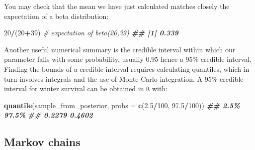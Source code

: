 \documentclass[
  12pt,
]{krantz}
\newenvironment{Shaded}{\begin{snugshade}}{\end{snugshade}}
\newcommand{\AttributeTok}[1]{\textcolor[rgb]{0.13,0.29,0.53}{#1}}
\newcommand{\CommentTok}[1]{\textcolor[rgb]{0.56,0.35,0.01}{\textit{#1}}}
\newcommand{\DecValTok}[1]{\textcolor[rgb]{0.00,0.00,0.81}{#1}}
\newcommand{\DocumentationTok}[1]{\textcolor[rgb]{0.56,0.35,0.01}{\textbf{\textit{#1}}}}
\newcommand{\FloatTok}[1]{\textcolor[rgb]{0.00,0.00,0.81}{#1}}
\newcommand{\FunctionTok}[1]{\textcolor[rgb]{0.13,0.29,0.53}{\textbf{#1}}}
\newcommand{\NormalTok}[1]{#1}
\newcommand{\SpecialCharTok}[1]{\textcolor[rgb]{0.81,0.36,0.00}{\textbf{#1}}}
\begin{document}
You may check that the mean we have just calculated matches closely the expectation of a beta distribution:

\begin{Shaded}
\begin{Highlighting}[]
\DecValTok{20}\SpecialCharTok{/}\NormalTok{(}\DecValTok{20}\SpecialCharTok{+}\DecValTok{39}\NormalTok{) }\CommentTok{\# expectation of beta(20,39)}
\DocumentationTok{\#\# [1] 0.339}
\end{Highlighting}
\end{Shaded}

Another useful numerical summary is the credible interval within which our parameter falls with some probability, usually 0.95 hence a 95\(\%\) credible interval. Finding the bounds of a credible interval requires calculating quantiles, which in turn involves integrals and the use of Monte Carlo integration. A 95\(\%\) credible interval for winter survival can be obtained in \texttt{R} with:

\begin{Shaded}
\begin{Highlighting}[]
\FunctionTok{quantile}\NormalTok{(sample\_from\_posterior, }\AttributeTok{probs =} \FunctionTok{c}\NormalTok{(}\FloatTok{2.5}\SpecialCharTok{/}\DecValTok{100}\NormalTok{, }\FloatTok{97.5}\SpecialCharTok{/}\DecValTok{100}\NormalTok{))}
\DocumentationTok{\#\#   2.5\%  97.5\% }
\DocumentationTok{\#\# 0.2279 0.4602}
\end{Highlighting}
\end{Shaded}

\subsection{Markov chains}\label{markovmodelmcmc}
\end{document}
